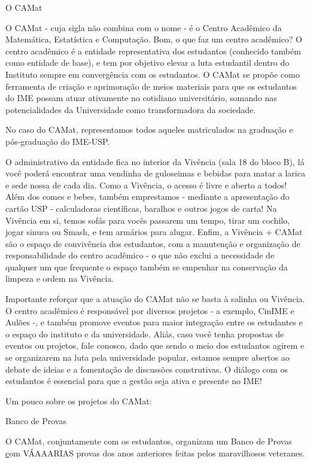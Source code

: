 \begin{secao}{O CAMat}

O CAMat - cuja sigla não combina com o nome - é o Centro Acadêmico da
Matemática, Estatística e Computação. Bom, o que faz um centro acadêmico? 
O centro acadêmico é a entidade representativa dos estudantos (conhecido 
também como entidade de base), e tem por objetivo elevar a luta estudantil 
dentro do Instituto sempre em convergência com os estudantos. O CAMat se 
propõe como ferramenta de criação e aprimoração de meios materiais para que 
os estudantos do IME possam atuar ativamente no cotidiano universitário, 
somando nas potencialidades da Universidade como transformadora da sociedade. 

No caso do CAMat, representamos todos aqueles matriculados na graduação e pós-graduação do IME-USP.

O administrativo da entidade fica no interior da Vivência (sala 18 do bloco B), lá você 
poderá encontrar uma vendinha de guloseimas e bebidas para matar a larica e sede nossa de
cada dia. Como a Vivência,  o acesso é livre e aberto a todos! Além dos
comes e bebes, também emprestamos - mediante a apresentação do cartão USP -
calculadoras científicas, baralhos e outros jogos de carta! Na Vivência em si, temos sofás
para vocês passarem um tempo, tirar um cochilo, jogar sinuca ou Smash, e
tem armários para alugar. Enfim, a Vivência + CAMat são o espaço de convivência 
dos estudantos, com a manutenção e organização de responsabilidade do centro acadêmico 
- o que não exclui a necessidade de qualquer um que frequente o espaço também se 
empenhar na conservação da limpeza e ordem na Vivência.

Importante reforçar que a atuação do CAMat não se basta à salinha ou Vivência. 
O centro acadêmico é responsável por diversos projetos - a exemplo, CinIME e Aulões 
-, e também promove eventos para maior integração entre os estudantes e o espaço do 
instituto e da universidade. Aliás, caso você tenha propostas de eventos ou projetos, 
fale conosco, dado que sendo o meio dos estudantos agirem e se organizarem na luta pela 
universidade popular, estamos sempre abertos ao debate de ideias e a fomentação de discussões 
construtivas. O diálogo com os estudantos é essencial para que a gestão seja ativa e presente no IME!

Um pouco sobre os projetos do CAMat:


\begin{subsecao}{Banco de Provas}

O CAMat, conjuntamente com os estudantos, organizam um Banco de Provas
\href{https://camat.ime.usp.br/apoio/} com VÁAAARIAS provas dos anos 
anteriores feitas pelos maravilhosos veteranes.


\end{subsecao}
\end{secao}
